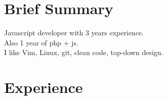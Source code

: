 \documentclass[a4paper, 14pt]{article}
\begin{document}
\begin{center}
	\textsc{\Huge{}}
\end{center}


\section{Brief Summary}
    Javascript developer with 3 years experience.  \\
    Also 1 year of php + js. \\
    I like Vim, Linux, git, clean code, top-down design.

\section{Experience}
\end{document}
